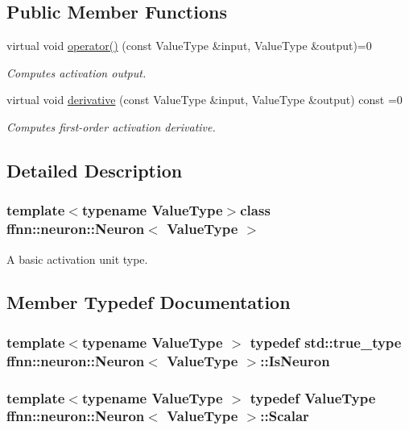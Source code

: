 \subsection*{Public Member Functions}
\begin{DoxyCompactItemize}
\item 
virtual void \hyperlink{classffnn_1_1neuron_1_1_neuron_ae215373ce29e135cb5fd728964772a32}{operator()} (const Value\-Type \&input, Value\-Type \&output)=0
\begin{DoxyCompactList}\small\item\em Computes activation output. \end{DoxyCompactList}\item 
virtual void \hyperlink{classffnn_1_1neuron_1_1_neuron_ac779b179887e6b4505dec96d0319af10}{derivative} (const Value\-Type \&input, Value\-Type \&output) const =0
\begin{DoxyCompactList}\small\item\em Computes first-\/order activation derivative. \end{DoxyCompactList}\end{DoxyCompactItemize}


\subsection{Detailed Description}
\subsubsection*{template$<$typename Value\-Type$>$class ffnn\-::neuron\-::\-Neuron$<$ Value\-Type $>$}

A basic activation unit type. 

\subsection{Member Typedef Documentation}
\hypertarget{classffnn_1_1neuron_1_1_neuron_a75bfde562dcb9d0e606f52ca73451de8}{
\subsubsection[{Is\-Neuron}]{\setlength{\rightskip}{0pt plus 5cm}template$<$typename Value\-Type $>$ typedef std\-::true\-\_\-type {\bf ffnn\-::neuron\-::\-Neuron}$<$ Value\-Type $>$\-::{\bf Is\-Neuron}}}\label{classffnn_1_1neuron_1_1_neuron_a75bfde562dcb9d0e606f52ca73451de8}
\hypertarget{classffnn_1_1neuron_1_1_neuron_a5c758fa2e21a6dc3de42b34016b93d56}{
\subsubsection[{Scalar}]{\setlength{\rightskip}{0pt plus 5cm}template$<$typename Value\-Type $>$ typedef Value\-Type {\bf ffnn\-::neuron\-::\-Neuron}$<$ Value\-Type $>$\-::{\bf Scalar}}}\label{classffnn_1_1neuron_1_1_neuron_a5c758fa2e21a6dc3de42b34016b93d56}


